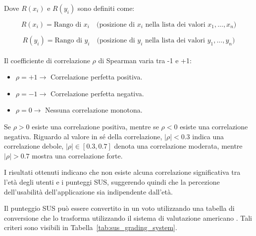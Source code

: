 Dove \( R(x_i) \) e \( R(y_i) \) sono definiti come:

\begin{equation}
    R(x_i) = \text{Rango di } x_i \quad \text{(posizione di } x_i \text{ nella lista dei valori } x_1, ..., x_n \text{)}
    \label{eq:rank_x}
\end{equation}

\begin{equation}
    R(y_i) = \text{Rango di } y_i \quad \text{(posizione di } y_i \text{ nella lista dei valori } y_1, ..., y_n \text{)}
    \label{eq:rank_y}
\end{equation}\\

Il coefficiente di correlazione \( \rho \) di Spearman varia tra -1 e +1:
\begin{itemize}
    \item \( \rho = +1 \rightarrow \) Correlazione perfetta positiva.
    \item \( \rho = -1 \rightarrow \) Correlazione perfetta negativa.
    \item \( \rho = 0 \rightarrow \) Nessuna correlazione monotona.
\end{itemize}

Se \( \rho > 0 \) esiste una correlazione positiva, mentre se \( \rho < 0 \) esiste una correlazione negativa. Riguardo al valore in sé della correlazione, \( |\rho| < 0.3 \) indica una correlazione debole, \( |\rho| \in [0.3, 0.7] \) denota una correlazione moderata, mentre \( |\rho| > 0.7 \) mostra una correlazione forte.

I risultati ottenuti indicano che non esiste alcuna correlazione significativa tra l'età degli utenti e i punteggi SUS, suggerendo quindi che la percezione dell'usabilità dell'applicazione sia indipendente dall'età.

Il punteggio SUS può essere convertito in un voto utilizzando una tabella di conversione che lo trasforma utilizzando il sistema di valutazione americano \cite{SUS}. Tali criteri sono visibili in Tabella~\ref{tab:sus_grading_system}.

